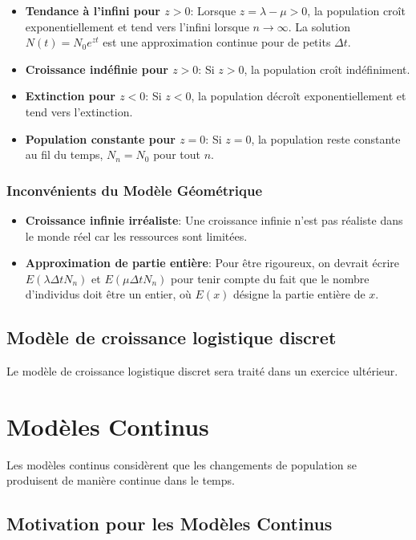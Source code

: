 \documentclass[oneside]{book}
\begin{document}
\begin{itemize}
    \item \textbf{Tendance à l'infini pour $z > 0$}: Lorsque $z = \lambda - \mu > 0$, la population croît exponentiellement et tend vers l'infini lorsque $n \to \infty$. La solution $N(t) = N_0 e^{zt}$ est une approximation continue pour de petits $\Delta t$.
    \item \textbf{Croissance indéfinie pour $z > 0$}: Si $z > 0$, la population croît indéfiniment.
    \item \textbf{Extinction pour $z < 0$}: Si $z < 0$, la population décroît exponentiellement et tend vers l'extinction.
    \item \textbf{Population constante pour $z = 0$}: Si $z = 0$, la population reste constante au fil du temps, $N_n = N_0$ pour tout $n$.
\end{itemize}

\subsubsection{Inconvénients du Modèle Géométrique}

\begin{itemize}
    \item \textbf{Croissance infinie irréaliste}: Une croissance infinie n'est pas réaliste dans le monde réel car les ressources sont limitées.
    \item \textbf{Approximation de partie entière}: Pour être rigoureux, on devrait écrire $E(\lambda \Delta t N_n)$ et $E(\mu \Delta t N_n)$ pour tenir compte du fait que le nombre d'individus doit être un entier, où $E(x)$ désigne la partie entière de $x$.
\end{itemize}

\subsection{Modèle de croissance logistique discret}
Le modèle de croissance logistique discret sera traité dans un exercice ultérieur.

\section{Modèles Continus}

Les modèles continus considèrent que les changements de population se produisent de manière continue dans le temps.

\subsection{Motivation pour les Modèles Continus}
\end{document}

